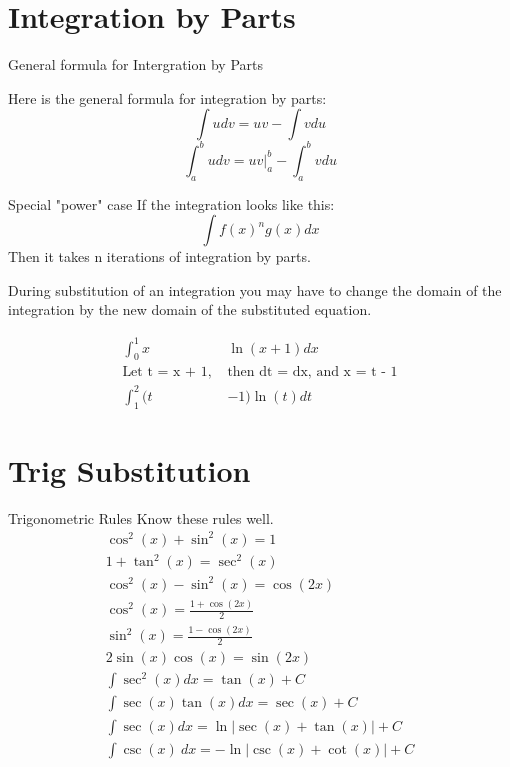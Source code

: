 \documentclass[letterpaper,10pt,twoside,twocolumn,openany]{book}
\begin{document}
\newpage



\section{Integration by Parts}
\begin{DndSidebar}[]{General formula for Intergration by Parts}
    
    Here is the general formula for integration by parts:
    \begin{equation}
        \int udv = uv - \int vdu
    \end{equation}
    \begin{equation}
        \int_a^b udv = uv|_a^b - \int_a^b vdu
    \end{equation}
\end{DndSidebar}

\begin{DndComment}{Special "power" case}
    If the integration looks like this:
    \begin{equation}
        \int f(x)^ng(x) dx
    \end{equation}
    Then it takes n iterations of integration by parts.
\end{DndComment}

During substitution of an integration you may have to change the domain of the integration by the new domain of the substituted equation.
\begin{DndComment}{}
    \begin{align*}
        \int_0^1 x &\ln(x+1) dx\\
        \text{Let t = x + 1, }&\text{then dt = dx, and x = t - 1}\\
        \int_1^2 (t&-1) \ln(t) dt
    \end{align*} 
\end{DndComment}


\section{Trig Substitution}
\begin{DndSidebar}[]{Trigonometric Rules}
    Know these rules well.    
    \begin{gather}
        \cos^2(x) + \sin^2(x) = 1\\
        1 + \tan^2(x) = \sec^2(x)\\
        \cos^2(x) - \sin^2(x) = \cos(2x)\\
        \cos^2(x) = \frac{1 + \cos(2x)}{2}\\
        \sin^2(x) = \frac{1 - \cos(2x)}{2}\\
        2 \sin(x) \cos(x) = \sin(2x)\\
        \int \sec^2(x) dx = \tan(x) + C\\
        \int \sec(x) \tan(x) dx = \sec(x) + C\\
        \int \sec(x) dx = \ln|\sec(x) + \tan(x)| + C\\
        \int \csc(x)\ dx = -\ln|\csc(x) + \cot(x)| + C
    \end{gather}
\end{DndSidebar}
\end{document}
